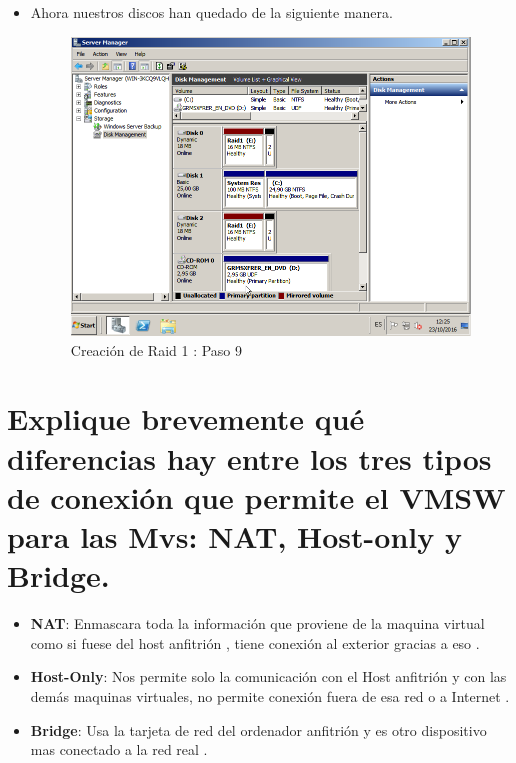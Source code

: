 \begin{itemize}
		\item Ahora nuestros discos han quedado de la siguiente manera.
		\begin{figure}[H] %
			\centering
			\includegraphics[scale=0.5]{pics/Captura9.png}  %
			\caption{Creación de Raid 1 : Paso 9} \label{fig:figura9}
		\end{figure}
	
	\end{itemize}
	


\section{Explique brevemente qué diferencias hay entre los tres tipos de conexión que permite el VMSW para las Mvs: NAT, Host-only y Bridge.}

\begin{itemize}
	\item \textbf{NAT}: Enmascara toda la información que proviene de la maquina virtual como si fuese del host anfitrión , tiene conexión al exterior gracias a eso \cite{red}.
	\item \textbf{Host-Only}: Nos permite solo la comunicación con el Host anfitrión y con las demás maquinas virtuales, no permite conexión fuera de esa red o a Internet \cite{red}.
	\item \textbf{Bridge}: Usa la tarjeta de red del ordenador anfitrión y es otro dispositivo mas conectado a la red real \cite{red}.
\end{itemize}

